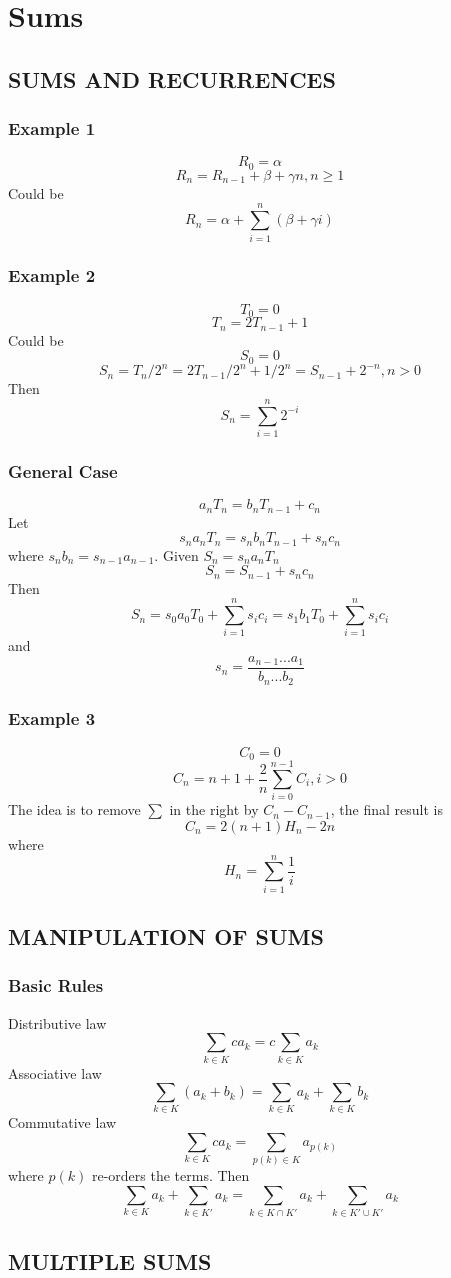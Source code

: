 \documentclass{article}
\newcommand{\insertcode}[2]{\begin{itemize}\item[]\end{itemize}}
\begin{document}
\newpage
\section{Sums}
\subsection{SUMS AND RECURRENCES}
\subsubsection{Example 1}
$$R_0 = \alpha$$
$$R_n = R_{n-1} + \beta + \gamma n, n\ge1$$
Could be
$$R_n = \alpha + \sum_{i=1}^{n}{(\beta + \gamma i)}$$
\subsubsection{Example 2}
$$T_0 = 0$$
$$T_n = 2T_{n-1}+1$$
Could be
$$S_0 = 0$$
$$S_n = T_n/2^n = 2T_{n-1}/2^n + 1/2^n = S_{n-1} + 2^{-n},n>0$$
Then
$$S_n = \sum_{i=1}^{n}{2^{-i}}$$
\subsubsection{General Case}
$$a_nT_n =b_nT_{n-1}+c_n$$
Let
$$s_na_nT_n =s_nb_nT_{n-1}+s_nc_n$$
where $s_nb_n = s_{n-1}a_{n-1}$.
Given $S_n = s_na_nT_n$
$$S_n = S_{n-1}+s_nc_n$$
Then
$$S_n = s_0a_0T_0 + \sum_{i=1}^{n}{s_ic_i} = s_1b_1T_0 + \sum_{i=1}^{n}{s_ic_i}$$
and
$$s_n = \frac{a_{n-1}...a_1}{b_n...b_2}$$
\subsubsection{Example 3}
$$C_0 = 0$$
$$C_n = n+1+\frac{2}{n}\sum_{i=0}^{n-1}C_i,i>0$$
The idea is to remove $\sum$ in the right by $C_n - C_{n-1}$, the final result is
$$C_n = 2(n+1)H_n - 2n$$
where
$$H_n = \sum_{i=1}^n{\frac{1}{i}}$$
\subsection{MANIPULATION OF SUMS}
\subsubsection{Basic Rules}
Distributive law
$$\sum_{k\in K} ca_k = c\sum_{k\in K}a_k$$
Associative law
$$\sum_{k\in K} {(a_k+b_k)} = \sum_{k\in K}a_k + \sum_{k\in K}b_k $$
Commutative law
$$\sum_{k\in K} ca_k = \sum_{p(k)\in K}a_{p(k)}$$
where $p(k)$ re-orders the terms.
Then
$$\sum_{k\in K} {a_k} + \sum_{k\in K'}{a_k} = \sum_{k\in K \cap K'} {a_k} + \sum_{k\in K' \cup K'}{a_k} $$

\subsection{MULTIPLE SUMS}








\end{document}

